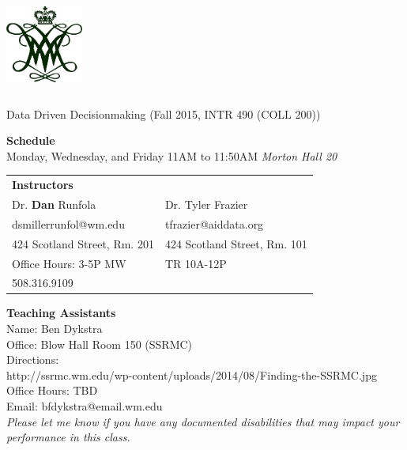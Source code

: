 \documentclass[11pt]{article}
\begin{document}
  \begin{center}

{\includegraphics[height=1.25in,width=1in]{wmchiffre1.jpg}} 

\LARGE Data Driven Decisionmaking (Fall 2015, INTR 490 (COLL 200))\\ \vspace{3mm}
\end{center}
\large \textbf{Schedule} \\
\normalsize  Monday, Wednesday, and Friday 11AM to 11:50AM \textit{Morton Hall 20} \\
\vspace{2mm}

\begin{table}[ht]
\begin{tabular}{l l}
\large \textbf{Instructors} & \\
\large Dr. \textbf{Dan} Runfola & Dr. Tyler Frazier \\
\large dsmillerrunfol@wm.edu  & tfrazier@aiddata.org \\
\large 424 Scotland Street, Rm. 201 & 424 Scotland Street, Rm. 101 \\
\large Office Hours: 3-5P MW & TR 10A-12P \\
\large 508.316.9109 &   \\
\end{tabular}
\end{table}


\large \textbf{Teaching Assistants} \\
\large Name: Ben Dykstra   \\
\large Office: Blow Hall Room 150 (SSRMC) \\
\large Directions: \\
http://ssrmc.wm.edu/wp-content/uploads/2014/08/Finding-the-SSRMC.jpg \\
\large Office Hours: TBD \\
\large Email: bfdykstra@email.wm.edu \\


\textit{Please let me know if you have any documented disabilities that may impact your performance in this class.}
\end{document}
